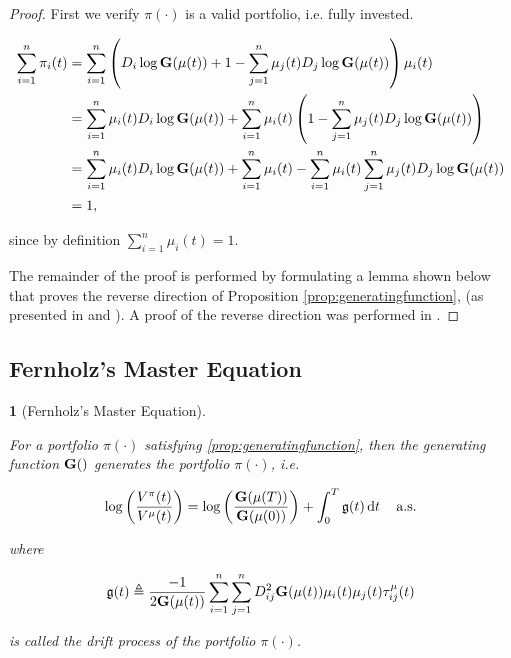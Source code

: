 \documentclass[british]{amsart} \usepackage{lmodern}
\numberwithin{equation}{section} \numberwithin{figure}{section}
\theoremstyle{plain} \newtheorem{thm}{\protect\theoremname}[section]
\theoremstyle{definition} \newtheorem{defn}[thm]{\protect\definitionname}
\theoremstyle{plain} \newtheorem{assumption}[thm]{\protect\assumptionname}
\theoremstyle{plain} \newtheorem{lem}[thm]{\protect\lemmaname}
\theoremstyle{plain} \newtheorem{prop}[thm]{\protect\propositionname}
\theoremstyle{remark} \newtheorem{rem}[thm]{\protect\remarkname}
\theoremstyle{plain} \newtheorem{cor}[thm]{\protect\corollaryname}
\renewcommand{\d}[1]{\mathop{\mathrm{d}{#1}}}
\begin{document}
\begin{proof}
  First we verify $\pi(\cdot)$ is a valid portfolio, i.e. fully invested.

   \begin{gather}
    \begin{split}
      \sum_{i=1}^{n} \pi_{i}(t) 
      &= \sum_{i=1}^{n} 
        \left( 
          D_{i}\log{\mathbf{G}(\mu(t))} + 1 - 
            \sum_{j=1}^{n} \mu_{j}(t)D_{j}\log{\mathbf{G}(\mu(t))}
        \right) \mu_{i}(t) \\
      &= 
        \sum_{i=1}^{n} \mu_{i}(t) D_{i}\log{\mathbf{G}(\mu(t))} + 
        \sum_{i=1}^{n} \mu_{i}(t)
        \left( 
          1 - \sum_{j=1}^{n} \mu_{j}(t)D_{j}\log{\mathbf{G}(\mu(t))}
        \right) \\
       &= 
        \sum_{i=1}^{n} \mu_{i}(t) D_{i}\log{\mathbf{G}(\mu(t))} + 
        \sum_{i=1}^{n} \mu_{i}(t) -
        \sum_{i=1}^{n} \mu_{i}(t) \sum_{j=1}^{n} \mu_{j}(t)D_{j}\log{\mathbf{G}(\mu(t))} \\
       &= 1,
    \end{split}
  \end{gather}

  since by definition $\sum_{i=1}^{n} \mu_{i}(t) = 1$.

  The remainder of the proof is performed by formulating a lemma shown below that
  proves the reverse direction of Proposition \ref{prop:generatingfunction}, (as
  presented in \cite{fernholz2009} and \cite{vervuurt2015}). A proof of the
  reverse direction was performed in \cite{fernholz1999pgf}. 

\end{proof}

\subsection{Fernholz's Master Equation}


\begin{lem} [Fernholz's Master Equation]
  \label{lem:masterequationlemma}

  For a portfolio $\pi(\cdot)$ satisfying \ref{prop:generatingfunction}, then the
  generating function $\mathbf{G}()$ generates the portfolio $\pi(\cdot)$, i.e.

  \begin{equation}
    \label{eq:masterequation}
    \log \left( \frac{V^{\pi}(t)}{V^{\mu}(t)} \right) = 
    \log \left( \frac{\G{\mu(T)}}{\G{\mu(0)}} \right) + 
      \int_{0}^{T} \g \d{t}
    \quad \almostsurely
  \end{equation}

  where 

  \begin{equation}
    \mathfrak{g}(t) \triangleq \frac{-1}{2 \mathbf{G}(\mu(t))}
        \sum_{i=1}^{n} \sum_{j=1}^{n} D_{ij}^{2} \mathbf{G}(\mu(t)) 
        \mu_{i}(t) \mu_{j}(t)
        \tau_{ij}^{\mu}(t)
  \end{equation}

  is called the \textit{drift process} of the portfolio $\pi(\cdot)$.

\end{lem}
\end{document}
